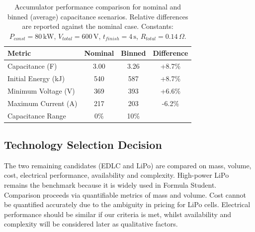 \begin{table}[htbp]
    \centering
    \caption{Accumulator performance comparison for nominal and binned (average) capacitance scenarios. Relative differences are reported against the nominal case. Constants: $P_{const}=80\,\mathrm{kW}$, $V_{total}=600\,\mathrm{V}$, $t_{finish}=4\,\mathrm{s}$, $R_{total}=0.14\,\Omega$.}
    \label{tab:capacitance_binning_results}
    \footnotesize
    \begin{tabular}{|l|c|c|c|}
        \hline
        \textbf{Metric} & \textbf{Nominal} & \textbf{Binned} & \textbf{Difference} \\
        \hline
        Capacitance (F) & 3.00 & 3.26 & +8.7\% \\
        Initial Energy (kJ) & 540 & 587 & +8.7\% \\
        Minimum Voltage (V) & 369 & 393 & +6.6\% \\
        Maximum Current (A) & 217 & 203 & -6.2\% \\
        Capacitance Range & 0\% & 10\% & \\
        \hline
    \end{tabular}
\end{table}

\subsection{Technology Selection Decision}

The two remaining candidates (EDLC and LiPo) are compared on mass, volume, cost, electrical performance, availability and complexity. High-power LiPo remains the benchmark because it is widely used in Formula Student. Comparison proceeds via quantifiable metrics of mass and volume. Cost cannot be quantified accurately due to the ambiguity in pricing for LiPo cells. Electrical performance should be similar if our criteria is met, whilst availability and complexity will be considered later as qualitative factors.

